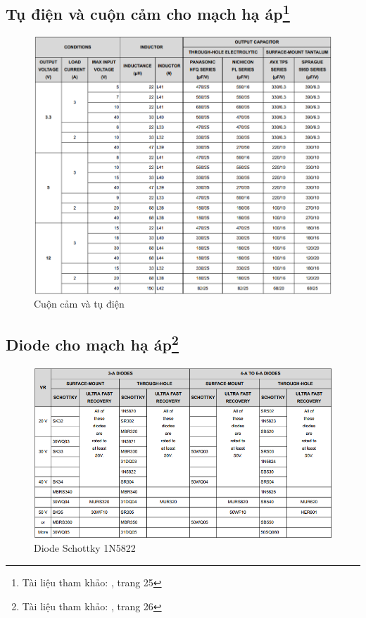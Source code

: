         \subsection[Tụ điện và cuộn cảm cho mạch hạ áp]{Tụ điện và cuộn cảm cho mạch hạ áp\footnote{Tài liệu tham khảo: \cite{lm2596}, trang 25}}
            \begin{figure}[H]
                \centering
                \includegraphics[width=1\textwidth]{pictures/appendix/app_p3_ChooseComponent.png}
                \caption{Cuộn cảm và tụ điện}
                \label{fig:InductorAndCapacitor}
            \end{figure}
        \subsection[Diode cho mạch hạ áp]{Diode cho mạch hạ áp\footnote{Tài liệu tham khảo: \cite{lm2596}, trang 26}}
            \begin{figure}[H]
                \centering
                \includegraphics[width=1\textwidth]{pictures/appendix/app_p4_DiodeChoose.png}
                \caption{Diode Schottky 1N5822}
                \label{fig:Diode}
            \end{figure}
    \newpage
